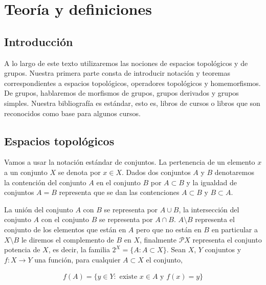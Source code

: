 




	

\tableofcontents

\chapter{Teoría y definiciones}

\section*{Introducción}

A lo largo de este texto utilizaremos las nociones de espacios topológicos y de grupos. Nuestra primera parte consta de introducir notación y teoremas correspondientes a espacios topológicos, operadores topológicos y homemorfismos. De grupos, hablaremos de morfismos de grupos, grupos derivados y grupos simples. Nuestra bibliografía es estándar, esto es, libros de cursos o libros que son reconocidos como base para algunos cursos. 

\section{Espacios topológicos}
 Vamos a usar la notación estándar de conjuntos. La pertenencia de un elemento $x$ a un conjunto $X$ se denota por $x \in X$. Dados dos conjuntos $A$ y $B$ denotaremos la contención del conjunto $A$ en el conjunto $B$ por $A \subset B$ y la igualdad de conjuntos $A=B$ representa que se dan las contenciones $A \subset B$ y $B \subset A$.

La unión del conjunto $A$ con $B$ se representa por $A \cup B$, la intersección del conjunto $A$ con el conjunto $B$ se representa por $A \cap B$. $A \setminus B$ representa el conjunto de los elementos que están en $A$ pero que no están en $B$ en particular a $X\setminus B$ le diremos el complemento de $B$ en $X$,  finalmente $\mathcal{P}X$ representa el conjunto potencia de $X$, es decir, la familia $2^X=\{A: A \subset X\}$.  Sean $X$, $Y$ conjuntos y $f:X \to Y$ una función, para cualquier $A \subset X$ el conjunto,
 
 \begin{align*}
 f(A)=\{y \in Y : \text{ existe }x \in A \text{ y } f(x)=y\}
 \end{align*}

